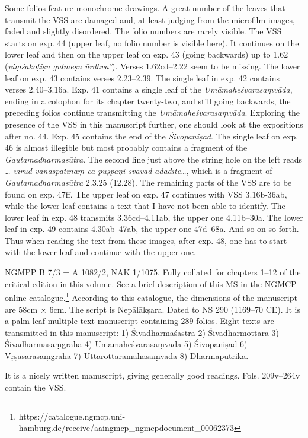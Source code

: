 \documentclass[11pt]{book}
\begin{document}
Some folios feature monochrome drawings. A great number of the leaves
that transmit the VSS are damaged and, at least judging from the
microfilm images, faded and slightly disordered. The folio numbers are
rarely visible. The VSS starts on exp. 44 (upper leaf, no folio number
is visible here). It continues on the lower leaf and then on the upper
leaf on exp. 43 (going backwards) up to 1.62 (\emph{viṃśakoṭiṣu gulmeṣu
ūrdhva°}). Verses 1.62cd--2.22 seem to be missing. The lower leaf on
exp. 43 contains verses 2.23--2.39. The single leaf in exp. 42 contains
verses 2.40--3.16a. Exp. 41 contains a single leaf of the
\emph{Umāmaheśvarasaṃvāda}, ending in a colophon for its chapter
twenty-two, and still going backwards, the preceding folios continue
transmitting the \emph{Umāmaheśvarasaṃvāda}. Exploring the presence of
the VSS in this manuscript further, one should look at the expositions
after no. 44. Exp. 45 contains the end of the \emph{Śivopaniṣad}. The
single leaf on exp. 46 is almost illegible but most probably contains a
fragment of the \emph{Gautamadharmasūtra}. The second line just above
the string hole on the left reads \emph{\ldots{} vīrud vanaspatīnāṃ ca
puṣpāṇi svavad} \emph{ādadīte\ldots{}}, which is a fragment of
\emph{Gautamadharmasūtra} 2.3.25 (12.28). The remaining parts of the VSS
are to be found on exp. 47ff. The upper leaf on exp. 47 continues with
VSS 3.16b-36ab, while the lower leaf contains a text that I have not
been able to identify. The lower leaf in exp. 48 transmits
3.36cd--4.11ab, the upper one 4.11b--30a. The lower leaf in exp. 49
contains 4.30ab--47ab, the upper one 47d--68a. And so on so forth. Thus
when reading the text from these images, after exp. 48, one has to start
with the lower leaf and continue with the upper one.


NGMPP B 7/3 = A 1082/2, NAK 1/1075. Fully collated for chapters 1--12 of
the critical edition in this volume. See a brief description of this MS
in the NGMCP online catalogue.\footnote{https://catalogue.ngmcp.uni-hamburg.de/receive/aaingmcp\_ngmcpdocument\_00062373}
According to this catalogue, the dimensions of the manuscript are 58cm ×
6cm. The script is Nepālākṣara. Dated to NS 290 (1169--70 CE). It is a
palm-leaf multiple-text manuscript containing 289 folios. Eight texts
are transmitted in this manuscript: 1) Śivadharmaśāstra 2)
Śivadharmottara 3) Śivadharmasaṃgraha 4) Umāmaheśvarasaṃvāda 5)
Śivopaniṣad 6) Vṛṣasārasaṃgraha 7) Uttarottaramahāsaṃvāda 8)
Dharmaputrikā.

It is a nicely written manuscript, giving generally good readings. Fols.
209v--264v contain the VSS.
\end{document}
